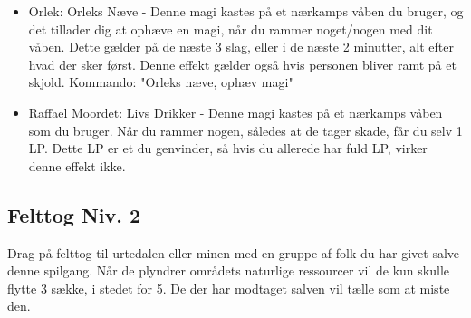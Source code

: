 \begin{itemize}
    \item Orlek: Orleks Næve - Denne magi kastes på et nærkamps våben du bruger, og det tillader dig at ophæve en magi, når du rammer noget/nogen med dit våben. Dette gælder på de næste 3 slag, eller i de næste 2 minutter, alt efter hvad der sker først. Denne effekt gælder også hvis personen bliver ramt på et skjold. Kommando: "Orleks næve, ophæv magi"
    \item Raffael Moordet: Livs Drikker -  Denne magi kastes på et nærkamps våben som du bruger. Når du rammer nogen, således at de tager skade, får du selv 1 LP. Dette LP er et du genvinder, så hvis du allerede har fuld LP, virker denne effekt ikke.
\end{itemize}

\subsection{Felttog Niv. 2}
Drag på felttog til urtedalen eller minen med en gruppe af folk du har givet salve denne spilgang. Når de plyndrer områdets naturlige ressourcer vil de kun skulle flytte 3 sække, i stedet for 5. De der har modtaget salven vil tælle som at miste den.
